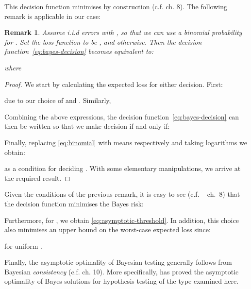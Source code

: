 \documentclass[a4paper]{article}
\newenvironment{IEEEproof}{\begin{proof}}{\end{proof}}
\theoremstyle{plain} \newtheorem{remark}{Remark}
\theoremstyle{plain} \newtheorem{definition}{Definition}
\theoremstyle{plain} \newtheorem{example}{Example}
\theoremstyle{plain} \newtheorem{assumption}{Assumption}
\theoremstyle{plain} \newtheorem{conjecture}{Conjecture}
\theoremstyle{plain} \newtheorem{theorem}{Theorem}
\theoremstyle{plain} \newtheorem{proposition}{Proposition}
\theoremstyle{plain} \newtheorem{lemma}{Lemma}
\theoremstyle{plain} \newtheorem{corollary}{Corollary}
\begin{document}
This decision function minimises  by construction
(c.f. \cite{Degroot:OptimalStatisticalDecisions} ch. 8). 
The following
remark is applicable in our case:
\begin{remark} Assume i.i.d errors with , so that
  we can use a binomial probability for .  Set the
  loss function  to be , 
  and  otherwise.  Then the decision
  function~\eqref{eq:bayes-decision} becomes equivalent to:

where

\end{remark}
\begin{IEEEproof}
  We start by calculating the expected loss for either decision. First:
  
  due to our choice of  and .  Similarly,
  
  Combining the above expressions, the decision
  function~\eqref{eq:bayes-decision} can then be written so that we
  make decision  if and only if:
  
  Finally, replacing \eqref{eq:binomial} with means 
  respectively and taking logarithms we obtain:
  
  as a condition for deciding . With some elementary
  manipulations, we arrive at the required result.
\end{IEEEproof}
Given
the conditions of the previous remark, it is easy to see
(c.f. ~\cite{Degroot:OptimalStatisticalDecisions} ch.~8) that the
decision function  minimises the Bayes risk:

Furthermore, for , we obtain
\eqref{eq:asymptotic-threshold}.  In addition, this choice also
minimises an upper bound on the worst-case expected loss since:

for uniform .

Finally, the asymptotic optimality of Bayesian testing generally
follows from Bayesian {\em consistency}
(c.f. \cite{Degroot:OptimalStatisticalDecisions} ch. 10). More
specifically, \cite{Chernoff:AsymptoticEfficiency} has proved the
asymptotic optimality of Bayes solutions for hypothesis testing of the
type examined here.  



\end{document}
